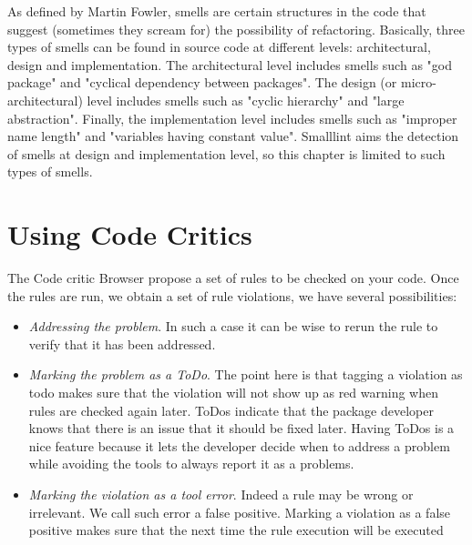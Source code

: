 \documentclass[a4paper,10pt,twoside]{book}
\begin{document}
As defined by Martin Fowler, smells are certain structures in the code that suggest (sometimes they scream for) the possibility of refactoring.
Basically, three types of smells can be found in source code at different levels: architectural, design and implementation. The architectural level includes smells such as "god package" and "cyclical dependency between packages". The design (or micro-architectural) level includes smells such as "cyclic hierarchy" and "large abstraction". Finally, the implementation level includes smells such as "improper name length" and "variables having constant value". Smalllint aims the detection of smells at design and implementation level, so this chapter is limited  to such types of smells.






\section{Using Code Critics}
The Code critic Browser propose a set of rules to be checked on your code. 
Once the rules are run, we obtain a set of rule violations, we have several possibilities:

\begin{itemize}
\item \emph{Addressing the problem}. In such a case it can be wise to rerun the rule to verify that it has been addressed.

\item \emph{Marking the problem as a ToDo}. The point here is that tagging a violation as todo makes sure that the violation will not show up as red warning when rules are checked again later. ToDos indicate that the package developer knows that there is an issue that it should be fixed later. Having ToDos is a nice feature because it lets the developer decide when to address a problem while avoiding the tools to always report it as a problems. 

\item \emph{Marking the violation as a tool error}. Indeed a rule may be wrong or irrelevant. We call such error a false positive. Marking a violation as a false positive makes sure that the next time the rule execution will be executed
\end{itemize}
\end{document}
